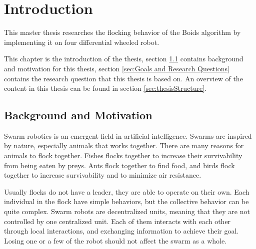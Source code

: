 \chapter{Introduction}
\label{cha:Introduction}

This master thesis researches the flocking behavior of the Boids algorithm by implementing it on four differential wheeled robot.

This chapter is the introduction of the thesis, section \ref{sec:BackgroundAndMotivation} contains background and motivation for this thesis, section \ref{sec:Goals and Research Questions} contains the research question that this thesis is based on. An overview of the content in this thesis can be found in section \ref{sec:thesisStructure}.



\section{Background and Motivation}
\label{sec:BackgroundAndMotivation}

Swarm robotics is an emergent field in artificial intelligence. Swarms are inspired by nature, especially animals that works together. There are many reasons for animals to flock together. Fishes flocks together to increase their survivability from being eaten by preys. Ants flock together to find food, and birds flock together to increase survivability and to minimize air resistance.

Usually flocks do not have a leader, they are able to operate on their own. Each individual in the flock have simple behaviors, but the collective behavior can be quite complex. Swarm robots are decentralized units, meaning that they are not controlled by one centralized unit. Each of them interacts with each other through local interactions, and exchanging information to achieve their goal. Losing one or a few of the robot should not affect the swarm as a whole.

